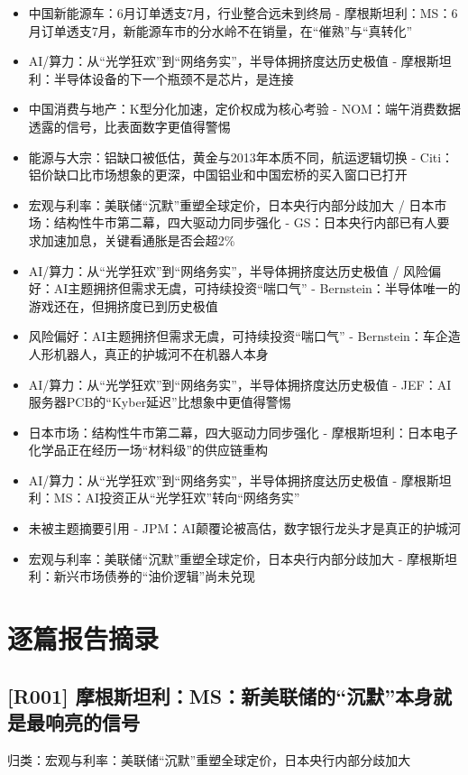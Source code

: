 \documentclass[11pt]{ctexart}
\begin{document}
\begin{itemize}
  \item [R033] 中国新能源车：6月订单透支7月，行业整合远未到终局 - 摩根斯坦利：MS：6月订单透支7月，新能源车市的分水岭不在销量，在“催熟”与“真转化”
  \item [R034] AI/算力：从“光学狂欢”到“网络务实”，半导体拥挤度达历史极值 - 摩根斯坦利：半导体设备的下一个瓶颈不是芯片，是连接
  \item [R035] 中国消费与地产：K型分化加速，定价权成为核心考验 - NOM：端午消费数据透露的信号，比表面数字更值得警惕
  \item [R036] 能源与大宗：铝缺口被低估，黄金与2013年本质不同，航运逻辑切换 - Citi：铝价缺口比市场想象的更深，中国铝业和中国宏桥的买入窗口已打开
  \item [R037] 宏观与利率：美联储“沉默”重塑全球定价，日本央行内部分歧加大 / 日本市场：结构性牛市第二幕，四大驱动力同步强化 - GS：日本央行内部已有人要求加速加息，关键看通胀是否会超2\%
  \item [R038] AI/算力：从“光学狂欢”到“网络务实”，半导体拥挤度达历史极值 / 风险偏好：AI主题拥挤但需求无虞，可持续投资“喘口气” - Bernstein：半导体唯一的游戏还在，但拥挤度已到历史极值
  \item [R039] 风险偏好：AI主题拥挤但需求无虞，可持续投资“喘口气” - Bernstein：车企造人形机器人，真正的护城河不在机器人本身
  \item [R040] AI/算力：从“光学狂欢”到“网络务实”，半导体拥挤度达历史极值 - JEF：AI服务器PCB的“Kyber延迟”比想象中更值得警惕
  \item [R041] 日本市场：结构性牛市第二幕，四大驱动力同步强化 - 摩根斯坦利：日本电子化学品正在经历一场“材料级”的供应链重构
  \item [R042] AI/算力：从“光学狂欢”到“网络务实”，半导体拥挤度达历史极值 - 摩根斯坦利：MS：AI投资正从“光学狂欢”转向“网络务实”
  \item [R043] 未被主题摘要引用 - JPM：AI颠覆论被高估，数字银行龙头才是真正的护城河
  \item [R044] 宏观与利率：美联储“沉默”重塑全球定价，日本央行内部分歧加大 - 摩根斯坦利：新兴市场债券的“油价逻辑”尚未兑现
\end{itemize}
\section{逐篇报告摘录}
\subsection{[R001] 摩根斯坦利：MS：新美联储的“沉默”本身就是最响亮的信号}
{\small\color{refgray}归类：宏观与利率：美联储“沉默”重塑全球定价，日本央行内部分歧加大}
\end{document}

